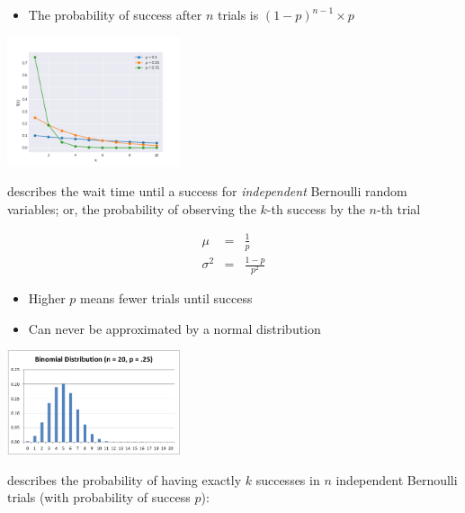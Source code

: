 \begin{itemize}
	\item The probability of success after $n$ trials is $(1 - p)^{n - 1} \times p$
\end{itemize}

\hformbar




\begin{center}
    \includegraphics[width=2in]{geometric_dist}
\end{center}

describes the wait time until a success for \textit{independent} Bernoulli random variables; or, the probability of observing the $k$-th success by the $n$-th trial

\begin{eqnarray}
  \mu       &=& \frac{1}{p} \\
  \sigma^2  &=& \frac{1 - p}{p^2}
\end{eqnarray}

\begin{itemize}
	\item Higher $p$ means fewer trials until success
	\item Can never be approximated by a normal distribution
\end{itemize}

\hformbar




\begin{center}
    \includegraphics[width=2in]{binomial}
\end{center}

describes the probability of having exactly $k$ successes in $n$ independent Bernoulli trials (with probability of success $p$):

